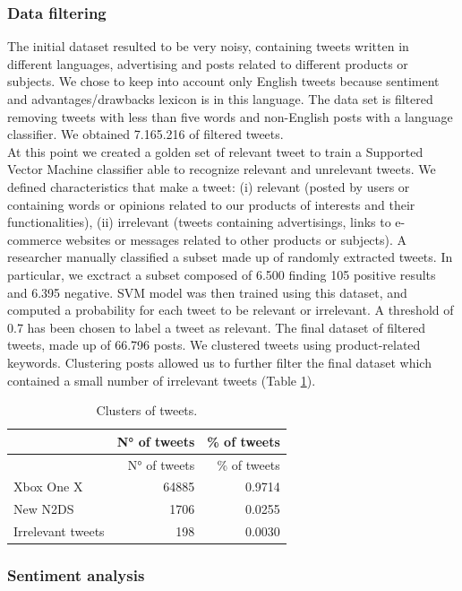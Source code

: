 \documentclass[]{book}
\begin{document}
\subsubsection*{Data filtering}\label{data-filtering}

The initial dataset resulted to be very noisy, containing tweets written
in different languages, advertising and posts related to different
products or subjects. We chose to keep into account only English tweets
because sentiment and advantages/drawbacks lexicon is in this language.
The data set is filtered removing tweets with less than five words and
non-English posts with a language classifier. We obtained 7.165.216 of
filtered tweets.\\
At this point we created a golden set of relevant tweet to train a
Supported Vector Machine classifier able to recognize relevant and
unrelevant tweets. We defined characteristics that make a tweet: (i)
relevant (posted by users or containing words or opinions related to our
products of interests and their functionalities), (ii) irrelevant
(tweets containing advertisings, links to e-commerce websites or
messages related to other products or subjects). A researcher manually
classified a subset made up of randomly extracted tweets. In particular,
we exctract a subset composed of 6.500 finding 105 positive results and
6.395 negative. SVM model was then trained using this dataset, and
computed a probability for each tweet to be relevant or irrelevant. A
threshold of 0.7 has been chosen to label a tweet as relevant. The final
dataset of filtered tweets, made up of 66.796 posts. We clustered tweets
using product-related keywords. Clustering posts allowed us to further
filter the final dataset which contained a small number of irrelevant
tweets (Table \ref{tab:tweetab1}).

\begin{longtable}[]{@{}lrr@{}}
\caption{\label{tab:tweetab1} Clusters of tweets.}\tabularnewline
\toprule
& N° of tweets & \% of tweets\tabularnewline
\midrule
\endfirsthead
\toprule
& N° of tweets & \% of tweets\tabularnewline
\midrule
\endhead
Xbox One X & 64885 & 0.9714\tabularnewline
New N2DS & 1706 & 0.0255\tabularnewline
Irrelevant tweets & 198 & 0.0030\tabularnewline
\bottomrule
\end{longtable}

\subsubsection*{Sentiment analysis}\label{sentiment-analysis}
\end{document}
